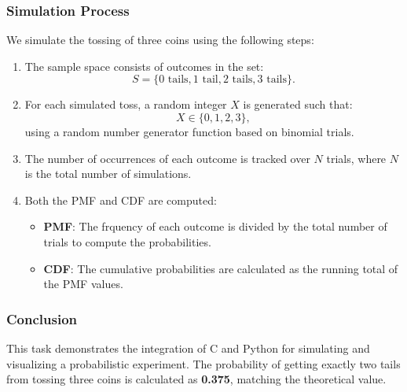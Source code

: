 \documentclass{beamer}
\begin{document}
\begin{frame}
\frametitle{Simulation Process}
We simulate the tossing of three coins using the following steps:
\begin{enumerate}
    \item The sample space consists of outcomes in the set:
    \[
    S = \{0 \text{ tails}, 1 \text{ tail}, 2 \text{ tails}, 3 \text{ tails}\}.
    \]
    \item For each simulated toss, a random integer \(X\) is generated such that:
    \[
    X \in \{0, 1, 2, 3\},
    \]
    using a random number generator function based on binomial trials.
    \item The number of occurrences of each outcome is tracked over \(N\) trials, where \(N\) is the total number of simulations.
    \item Both the PMF and CDF are computed:
    \begin{itemize}
        \item \textbf{PMF}: The frquency of each outcome is divided by the total number of trials to compute the probabilities.
        \item \textbf{CDF}: The cumulative probabilities are calculated as the running total of the PMF values.
    \end{itemize}
\end{enumerate}
\end{frame}

\begin{frame}
\frametitle{Conclusion}
This task demonstrates the integration of C and Python for simulating and visualizing a probabilistic experiment. The probability of getting exactly two tails from tossing three coins is calculated as \textbf{0.375}, matching the theoretical value.
\end{frame}
\end{document}
